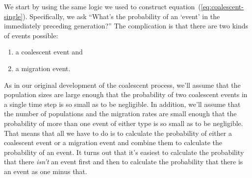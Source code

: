 \documentclass[12pt]{article}
\begin{document}
We start by using the same logic we used to construct
equation~(\ref{eq:coalescent-single}). Specifically, we ask ``What's
the probability of an `event' in the immediately preceding
generation?'' The complication is that there are two kinds of events
possible: 

\begin{enumerate}

\item a coalescent event and 

\item a migration event. 

\end{enumerate}

\noindent As in our original development of the coalescent process,
we'll assume that the population sizes are large enough that the
probability of two coalescent events in a single time step is so small
as to be negligible. In addition, we'll assume that the number of
populations and the migration rates are small enough that the
probability of more than one event of either type is so small as to be
negligible. That means that all we have to do is to calculate the
probability of either a coalescent event or a migration event and
combine them to calculate the probability of an event. It turns out
that it's easiest to calculate the probability that there {\it
  isn't\/} an event first and then to calculate the probability that
there is an event as one minus that.
\end{document}
